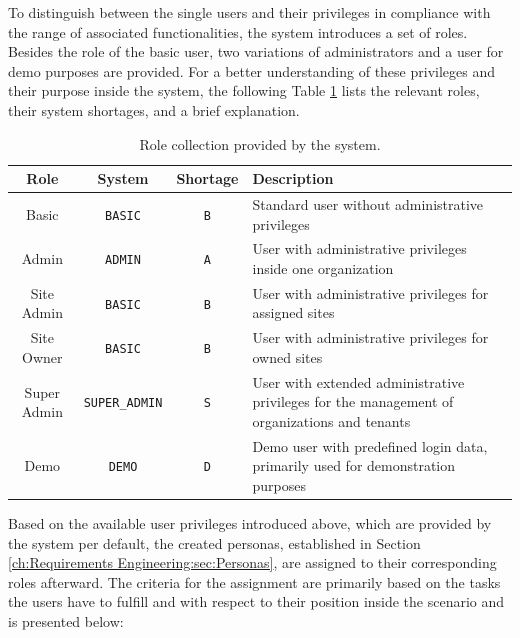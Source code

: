 To distinguish between the single users and their privileges in compliance with the range of associated functionalities, the system introduces a set of roles. Besides the role of the basic user, two variations of administrators and a user for demo purposes are provided.
For a better understanding of these privileges and their purpose inside the system, the following Table \ref{tab:system-role-collection} lists the relevant roles, their system shortages, and a brief explanation.

\begingroup
\setlength{\tabcolsep}{10pt} %
\renewcommand{\arraystretch}{1.5} %
\begin{table}[h]
    \centering
    \caption{Role collection provided by the system.}
    \begin{tabular}{c|c|c|m{6cm}}
        Role & System & Shortage & Description \\
        \hline
        Basic & \verb|BASIC| & \verb|B| & Standard user without administrative privileges \\
        Admin & \verb|ADMIN| & \verb|A| & User with administrative privileges inside one organization \\
        Site Admin & \verb|BASIC| & \verb|B| & User with administrative privileges for assigned sites \\
        Site Owner & \verb|BASIC| & \verb|B| & User with administrative privileges for owned sites \\
        Super Admin & \verb|SUPER_ADMIN| & \verb|S| & User with extended administrative privileges for the management of organizations and tenants \\
        Demo & \verb|DEMO| & \verb|D| & Demo user with predefined login data, primarily used for demonstration purposes
    \end{tabular}
    \label{tab:system-role-collection}
\end{table}
\endgroup

\noindent Based on the available user privileges introduced above, which are provided by the system per default, the created personas, established in Section \ref{ch:Requirements Engineering:sec:Personas}, are assigned to their corresponding roles afterward. The criteria for the assignment are primarily based on the tasks the users have to fulfill and with respect to their position inside the scenario and is presented below:

